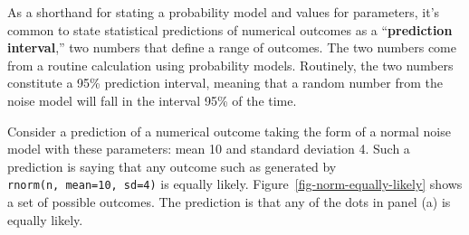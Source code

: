 \documentclass[
  letterpaper,
  DIV=11,
  numbers=noendperiod,
  oneside]{scrartcl}
\begin{document}
As a shorthand for stating a probability model and values for
parameters, it's common to state statistical predictions of numerical
outcomes as a ``\textbf{prediction interval},'' two numbers that define
a range of outcomes. The two numbers come from a routine calculation
using probability models. Routinely, the two numbers constitute a 95\%
prediction interval, meaning that a random number from the noise model
will fall in the interval 95\% of the time.

\begin{tcolorbox}[enhanced jigsaw, colbacktitle=quarto-callout-note-color!10!white, opacityback=0, breakable, opacitybacktitle=0.6, colback=white, coltitle=black, arc=.35mm, title=\textcolor{quarto-callout-note-color}{\faInfo}\hspace{0.5em}{Intervals from a noise model}, left=2mm, colframe=quarto-callout-note-color-frame, rightrule=.15mm, bottomrule=.15mm, leftrule=.75mm, bottomtitle=1mm, toptitle=1mm, titlerule=0mm, toprule=.15mm]

Consider a prediction of a numerical outcome taking the form of a normal
noise model with these parameters: mean 10 and standard deviation 4.
Such a prediction is saying that any outcome such as generated by
\texttt{rnorm(n,\ mean=10,\ sd=4)} is equally likely.
Figure~\ref{fig-norm-equally-likely} shows a set of possible outcomes.
The prediction is that any of the dots in panel (a) is equally likely.

\begin{figure}[H]

\begin{minipage}{0.33\linewidth}

\end{minipage}
\end{figure}
\end{tcolorbox}
\end{document}
